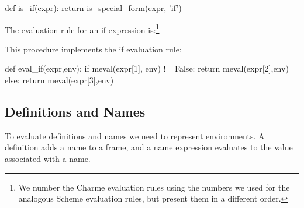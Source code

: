 \begin{pythoncode}
def is_if(expr):
    return is_special_form(expr, 'if')
\end{pythoncode}

The evaluation rule for an if expression is:\footnote{We number the Charme evaluation rules using the numbers we used for the analogous Scheme evaluation rules, but present them in a different order.}


This procedure implements the if evaluation rule:
\begin{pythoncode}
def eval_if(expr,env):
    if meval(expr[1], env) != False: return meval(expr[2],env)
    else: return meval(expr[3],env)
\end{pythoncode}

%    
%


\subsection{Definitions and Names}

To evaluate definitions and names we need to represent environments.  A definition adds a name to a frame, and a name expression evaluates to the value associated with a name.

